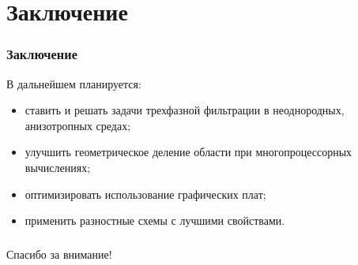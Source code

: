 \documentclass[10pt,pdf,hyperref={unicode}]{beamer} %
\begin{document}
\section{Заключение}
\begin{frame}
\begin{center}
\frametitle{Заключение}
{\Large В дальнейшем планируется:}
\vspace{1.0cm}
\begin{itemize}
\item	{\large ставить и решать задачи трехфазной фильтрации в
	неоднородных, анизотропных средах;}		
\vspace{0.5cm}
\item 	{\large улучшить геометрическое деление области при многопроцессорных
	вычислениях;}
\vspace{0.5cm}
\item 	{\large оптимизировать использование графических плат;}
\vspace{0.5cm}
\item 	{\large применить разностные схемы с лучшими свойствами.}
\end{itemize}
\end{center}
\end{frame}

\begin{frame}
\begin{center}
\frametitle{}
\item {\huge Спасибо за внимание!}
\end{center}
\end{frame}
\end{document}
